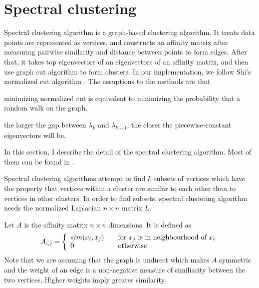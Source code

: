 \section{Spectral clustering}
Spectral clustering algorithm is a graph-based clustering algorithm. 
It treats data points are represented as vertices, and constructs an affinity matrix after measuring pairwise similarity and distance between points to form edges. 
After that, it takes top eigenvectors of an eigenvectors of an affinity matrix, and then use graph cut algorithm to form clusters. 
In our implementation, we follow Shi's normalized cut algorithm \cite{jianbo03}. 
The assuptions to the methods are that \begin{inparaenum}[\itshape a\upshape)]
\item minimizing normalized cut is equivalent to minimizing the probability that a random walk on the graph.
\item the larger the gap between $\lambda_{k}$ and $\lambda_{k+1}$, the closer the piecewise-constant eigenvectors will be.
\end{inparaenum}
In this section, I describe the detail of the spectral clustering algorithm. 
Most of them can be found in \cite{ulrike07}. 

Spectral clustering algorithms attempt to find $k$ subsets of vertices which have the property that vertices within a cluster are similar to each other than to vertices in other clusters. 
In order to find subsets, spectral clustering algorithm needs the normalized Laplacian $n \times n$ matrix $L$. 

Let $A$ is the affinity matrix $n \times n$ dimensions. It is defined as 
\begin{equation}
A_{i,j} = \left\{ 
  \begin{array}{l l}
    sim(x_i, x_j) & \quad \text{for $x_j$ is in neighbourhood of $x_i$}\\
    0 & \quad \text{otherwise}
  \end{array} \right.
\end{equation}
Note that we are assuming that the graph is undirect which makes $A$ symmetric and the weight of an edge is a non-negative measure of similiarity between the two vertices. 
Higher weights imply greater similarity. 

